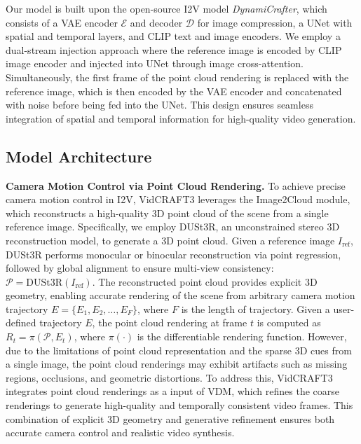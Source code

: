 Our model is built upon the open-source I2V model \textit{DynamiCrafter}, which consists of a VAE encoder $\mathcal{E}$ and decoder $\mathcal{D}$ for image compression, a UNet with spatial and temporal layers, and CLIP text and image encoders. 
We employ a dual-stream injection approach where the reference image is encoded by CLIP image encoder and injected into UNet through image cross-attention. Simultaneously, the first frame of the point cloud rendering is replaced with the reference image, which is then encoded by the VAE encoder and concatenated with noise before being fed into the UNet. This design ensures seamless integration of spatial and temporal information for high-quality video generation.



\subsection{Model Architecture}
\label{subsec:architecture}

\noindent \textbf{Camera Motion Control via Point Cloud Rendering.}
To achieve precise camera motion control in I2V, VidCRAFT3 leverages the Image2Cloud module, which reconstructs a high-quality 3D point cloud of the scene from a single reference image. Specifically, we employ DUSt3R, an unconstrained stereo 3D reconstruction model, to generate a 3D point cloud. Given a reference image $I_\text{ref}$, DUSt3R performs monocular or binocular reconstruction via point regression, followed by global alignment to ensure multi-view consistency: $\mathcal{P} = \text{DUSt3R}(I_{\text{ref}})$. The reconstructed point cloud provides explicit 3D geometry, enabling accurate rendering of the scene from arbitrary camera motion trajectory $E = \{E_1, E_2, \ldots, E_F\}$, where $F$ is the length of trajectory. Given a user-defined trajectory $E$, the point cloud rendering at frame $t$ is computed as $R_t = \pi(\mathcal{P}, E_t)$, where $\pi(\cdot)$ is the differentiable rendering function.
However, due to the limitations of point cloud representation and the sparse 3D cues from a single image, the point cloud renderings may exhibit artifacts such as missing regions, occlusions, and geometric distortions.
To address this, VidCRAFT3 integrates point cloud renderings as a input of VDM, which refines the coarse renderings to generate high-quality and temporally consistent video frames. This combination of explicit 3D geometry and generative refinement ensures both accurate camera control and realistic video synthesis.


